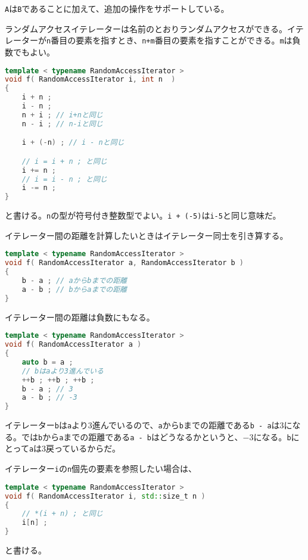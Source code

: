 \texttt{A}は\texttt{B}であることに加えて、追加の操作をサポートしている。


ランダムアクセスイテレーターは名前のとおりランダムアクセスができる。イテレーターが\texttt{n}番目の要素を指すとき、\texttt{n+m}番目の要素を指すことができる。\texttt{m}は負数でもよい。

\begin{lstlisting}[language={C++}]
template < typename RandomAccessIterator >
void f( RandomAccessIterator i, int n  )
{
    i + n ;
    i - n ;
    n + i ; // i+nと同じ
    n - i ; // n-iと同じ

    i + (-n) ; // i - nと同じ

    // i = i + n ; と同じ
    i += n ;
    // i = i - n ; と同じ
    i -= n ;
}
\end{lstlisting}
と書ける。\texttt{n}の型が符号付き整数型でよい。\texttt{i + (-5)}は\texttt{i-5}と同じ意味だ。

イテレーター間の距離を計算したいときはイテレーター同士を引き算する。

\begin{lstlisting}[language={C++}]
template < typename RandomAccessIterator >
void f( RandomAccessIterator a, RandomAccessIterator b )
{
    b - a ; // aからbまでの距離
    a - b ; // bからaまでの距離
}
\end{lstlisting}

イテレーター間の距離は負数にもなる。

\begin{lstlisting}[language={C++}]
template < typename RandomAccessIterator >
void f( RandomAccessIterator a )
{
    auto b = a ;
    // bはaより3進んでいる
    ++b ; ++b ; ++b ;
    b - a ; // 3
    a - b ; // -3
}
\end{lstlisting}

イテレーター\texttt{b}は\texttt{a}より3進んでいるので、\texttt{a}から\texttt{b}までの距離である\texttt{b - a}は3になる。では\texttt{b}から\texttt{a}までの距離である\texttt{a - b}はどうなるかというと、\(-3\)になる。\texttt{b}にとって\texttt{a}は3戻っているからだ。

イテレーター\texttt{i}の\texttt{n}個先の要素を参照したい場合は、
\begin{lstlisting}[language={C++}]
template < typename RandomAccessIterator >
void f( RandomAccessIterator i, std::size_t n )
{
    // *(i + n) ; と同じ
    i[n] ;
}
\end{lstlisting}
と書ける。


